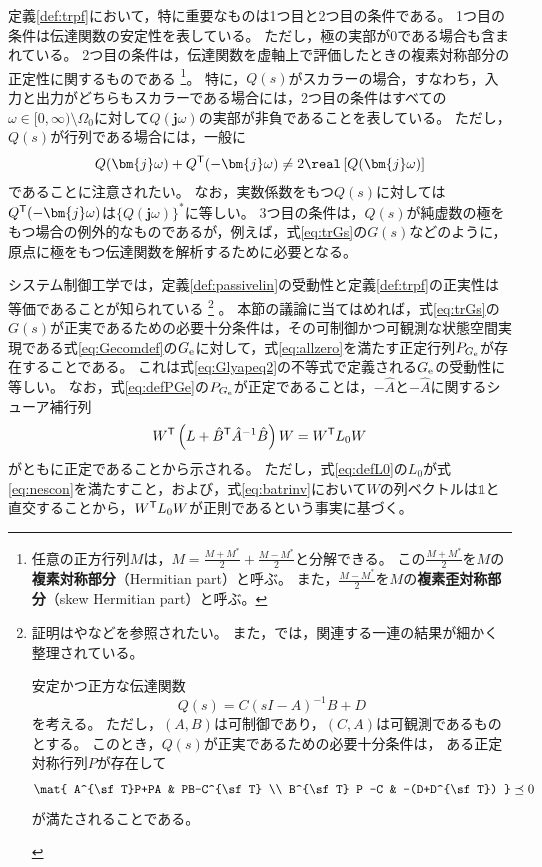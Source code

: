 \documentclass[tombow,dvipdfmx]{corona-a5-1.1}
\begin{document}
定義\ref{def:trpf}において，特に重要なものは1つ目と2つ目の条件である。
1つ目の条件は伝達関数の安定性を表している。
ただし，極の実部が0である場合も含まれている。
2つ目の条件は，伝達関数を虚軸上で評価したときの複素対称部分の正定性に関するものである
\footnote{
任意の正方行列$M$は，$M=\tfrac{M+M^*}{2}+\tfrac{M-M^*}{2}$と分解できる。
この$\tfrac{M+M^*}{2}$を$M$の\textbf{複素対称部分}（Hermitian part）と呼ぶ。
また，$\tfrac{M-M^*}{2}$を$M$の\textbf{複素歪対称部分}（skew Hermitian part）と呼ぶ。
}。
特に，$Q(s)$がスカラーの場合，すなわち，入力と出力がどちらもスカラーである場合には，2つ目の条件はすべての$\omega \in [0,\infty)\setminus \Omega_0$に対して$Q(\bm{j}\omega)$の実部が非負であることを表している。
ただし，$Q(s)$が行列である場合には，一般に
\begin{align*}
Q(\bm{j} \omega) + Q^{\sf T}(-\bm{j} \omega) \neq 2 \real\left[ Q(\bm{j} \omega) \right]
\end{align*}
であることに注意されたい。
なお，実数係数をもつ$Q(s)$に対しては$Q^{\sf T}( -\bm{j} \omega)$は$\{Q(\bm{j} \omega)\}^*$に等しい。
3つ目の条件は，$Q(s)$が純虚数の極をもつ場合の例外的なものであるが，例えば，式\ref{eq:trGs}の$G(s)$などのように，原点に極をもつ伝達関数を解析するために必要となる。


システム制御工学では，定義\ref{def:passivelin}の受動性と定義\ref{def:trpf}の正実性は等価であることが知られている
\footnote{
証明は\cite[Theorem 5.31]{antoulas2005approximation}や\cite[Theorem 3]{anderson1967system}などを参照されたい。
また，\cite{kottenstette2010relationships}では，関連する一連の結果が細かく整理されている。
\begin{補題*}
安定かつ正方な伝達関数
\[
Q(s)=C(sI-A)^{-1}B + D
\]
を考える。
ただし，$(A,B)$は可制御であり，$(C,A)$は可観測であるものとする。
このとき，$Q(s)$が正実であるための必要十分条件は，
ある正定対称行列$P$が存在して
\begin{align*}%
\mat{
A^{\sf T}P+PA & PB-C^{\sf T} \\
B^{\sf T} P -C & -(D+D^{\sf T})
}\preceq 0
\end{align*}
が満たされることである。
\end{補題*}
}
。
本節の議論に当てはめれば，式\ref{eq:trGs}の$G(s)$が正実であるための必要十分条件は，その可制御かつ可観測な状態空間実現である式\ref{eq:Gecomdef}の$G_{\rm e}$に対して，式\ref{eq:allzero}を満たす正定行列$P_{G_{\rm e}}$が存在することである。
これは式\ref{eq:Glyapeq2}の不等式で定義される$G_{\rm e}$の受動性に等しい。
なお，式\ref{eq:defPGe}の$P_{G_{\rm e}}$が正定であることは，$-\hat{A}$と$-\hat{A}$に関するシューア補行列
\[
W^{\sf T} \left(L+\hat{B}^{\sf T} \hat{A}^{-1} \hat{B} \right) W
=  W^{\sf T} L_0 W
\]
がともに正定であることから示される。
ただし，式\ref{eq:defL0}の$L_0$が式\ref{eq:nescon}を満たすこと，および，式\ref{eq:batrinv}において$W$の列ベクトルは$\mathds{1}$と直交することから，$W^{\sf T} L_0 W$が正則であるという事実に基づく。
\end{document}
